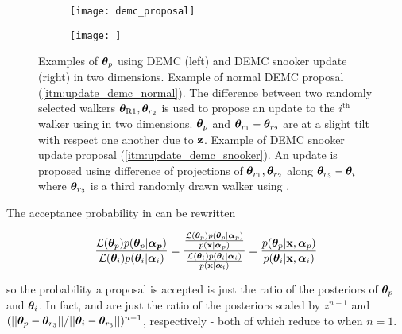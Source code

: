 \begin{figure}
\centering
\begin{subfigure}[t]{0.5\textwidth}
\centering
\texttt{[image: demc\_proposal]}
\end{subfigure}%
\begin{subfigure}[t]{0.5\textwidth}
\centering
\texttt{[image: ]}
\end{subfigure}
\caption{Examples of $\boldsymbol{\theta}_p$ using DEMC (left) and DEMC snooker update (right) in two dimensions.  Example of normal DEMC
proposal (\cref{itm:update_demc_normal}).  The difference between two randomly selected walkers
$\boldsymbol{\theta}_{\mathrm{R1}}, \boldsymbol{\theta}_{r_2}$ is used to propose an update to the $i^{\mathrm{th}}$ walker using
 in two dimensions.  $\boldsymbol{\theta}_p$ and
$\boldsymbol{\theta}_{r_1} - \boldsymbol{\theta}_{r_2}$ are at a slight tilt with respect one another due to $\mathbf{z}$.  Example
of DEMC snooker update proposal (\cref{itm:update_demc_snooker}).  An update is proposed using difference of projections of
$\boldsymbol{\theta}_{r_1}, \boldsymbol{\theta}_{r_2}$ along $\boldsymbol{\theta}_{r_3} - \boldsymbol{\theta}_i$ where
$\boldsymbol{\theta}_{r_3}$ is a third randomly drawn walker using .}
\label{fig:elifetime_fit_mcmc_demc_diagram}
\end{figure}

The acceptance probability in  can be rewritten

\begin{equation}
\frac{\mathcal{L}(\boldsymbol{\theta}_p) p(\boldsymbol{\theta}_p|\boldsymbol{\alpha_p})}
{\mathcal{L}(\boldsymbol{\theta}_i) p(\boldsymbol{\theta}_i|\boldsymbol{\alpha}_i)} =
\dfrac{\frac{\mathcal{L}(\boldsymbol{\theta}_p) p(\boldsymbol{\theta}_p|\boldsymbol{\alpha}_p)}{p(\mathbf{x}|\boldsymbol{\alpha}_p)}}
{\frac{\mathcal{L}(\boldsymbol{\theta}_i) p(\boldsymbol{\theta}_i|\boldsymbol{\alpha}_i)}{p(\mathbf{x}|\boldsymbol{\alpha}_i)}} =
\frac{p(\boldsymbol{\theta}_p|\mathbf{x}, \boldsymbol{\alpha}_p)}{p(\boldsymbol{\theta}_i|\mathbf{x}, \boldsymbol{\alpha}_i)}
\label{eq:elifetime_fit_mcmc_acc_ratio}
\end{equation}

\noindent so the probability a proposal is accepted is just the ratio of the posteriors of $\boldsymbol{\theta}_p$ and
$\boldsymbol{\theta}_i$.  In fact,  and
 are just the ratio of the posteriors scaled by $z^{n-1}$ and
$(||\boldsymbol{\theta}_p - \boldsymbol{\theta}_{r_3}|| / ||\boldsymbol{\theta}_i - \boldsymbol{\theta}_{r_3}||)^{n - 1}$, respectively - both
of which reduce to  when $n = 1$.



